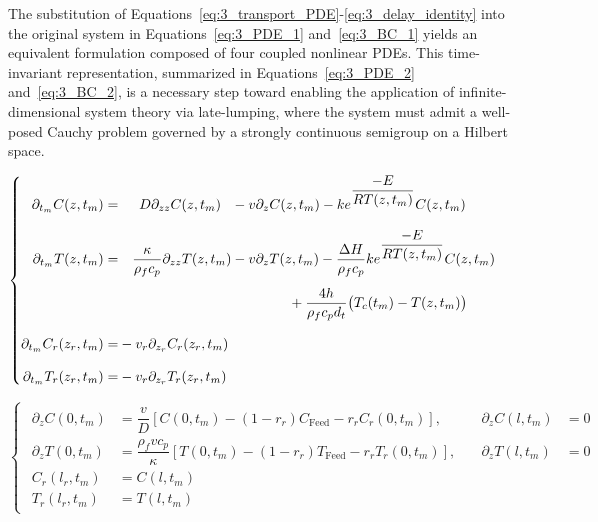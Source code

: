 The substitution of Equations~\eqref{eq:3_transport_PDE}-\eqref{eq:3_delay_identity} into the original system in Equations~\eqref{eq:3_PDE_1} and~\eqref{eq:3_BC_1} yields an equivalent formulation composed of four coupled nonlinear PDEs. This time-invariant representation, summarized in Equations~\eqref{eq:3_PDE_2} and~\eqref{eq:3_BC_2}, is a necessary step toward enabling the application of infinite-dimensional system theory via late-lumping, where the system must admit a well-posed Cauchy problem governed by a strongly continuous semigroup on a Hilbert space.


\begin{equation} \label{eq:3_PDE_2}
\begin{cases}
\begin{alignedat}{2}
    \partial_{t_m} C(z, t_m) = &\hspace{1.5em} D \partial_{zz} C(z, t_m) 
    &&- v \partial_z C(z, t_m) 
    - k e^{\dfrac{-E}{R T(z, t_m)}} C(z, t_m) \\[2.0ex]

    \partial_{t_m} T(z, t_m) = &\hspace{1em}\dfrac{\kappa}{\rho_f c_p} \partial_{zz} T(z, t_m) 
    &&- v \partial_z T(z, t_m)
    - \dfrac{\Delta H}{\rho_f c_p} k e^{\dfrac{-E}{R T(z, t_m)}} C(z, t_m) \\[1.2ex]
    &&& \hspace{4.1em} + \dfrac{4h}{\rho_f c_p d_t} \bigl( T_c(t_m) - T(z, t_m) \bigr) \\[2.0ex]

    \partial_{t_m} C_r(z_r, t_m) = &- v_r \partial_{z_r} C_r(z_r, t_m) \\[2.0ex]

    \partial_{t_m} T_r(z_r, t_m) = &- v_r \partial_{z_r} T_r(z_r, t_m)
\end{alignedat}
\end{cases}
\end{equation}

\begin{equation} \label{eq:3_BC_2}
\begin{cases}
\begin{alignedat}{2}
    \partial_z C(0, t_m) &= \dfrac{v}{D} \left[ C(0, t_m) - (1 - r_r) C_\text{Feed} - r_r C_r(0, t_m) \right], \quad &\partial_z C(l, t_m) &= 0 \\[1.5ex]

    \partial_z T(0, t_m) &= \dfrac{\rho_f v c_p}{\kappa} \left[ T(0, t_m) - (1 - r_r) T_\text{Feed} - r_r T_r(0, t_m) \right], \quad &\partial_z T(l, t_m) &= 0 \\[1.5ex]

    C_r(l_r, t_m) &= C(l, t_m) \\[1.5ex]
    T_r(l_r, t_m) &= T(l, t_m)
\end{alignedat}
\end{cases}
\end{equation}


